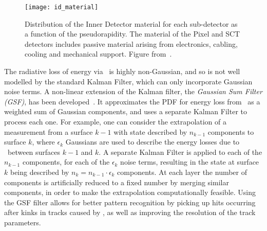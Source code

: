 \begin{figure}[h]
\centering
            \texttt{[image: id\_material]}
\caption{
Distribution of the Inner Detector material for each sub-detector as a
function of the pseudorapidity. The material of the Pixel and SCT detectors
includes passive material arising from electronics, cabling, cooling and
mechanical support. Figure from~\cite{ATLAS-CONF-2012-047}.}
\label{fig:id-material}
\end{figure}


The radiative loss of energy via \brem\ is highly non-Gaussian, and so is not
well modelled by the standard Kalman Filter, which can only incorporate Gaussian
noise terms. A non-linear extension of the
Kalman filter, the {\it Gaussian Sum Filter (GSF)}, has been
developed~\cite{Fruhwirth2003131,Atkinson:1448253}. It
approximates the PDF for energy loss from \brem\ as a weighted sum of Gaussian
components, and uses a separate Kalman Filter to process each one. For example,
one can consider the extrapolation of a measurement from a surface $k-1$ with state
described by $n_{k-1}$ components to surface $k$, where $\epsilon_{k}$ Gaussians
are used to describe the energy losses due to \brem\ between surfaces $k-1$ and
$k$. A separate Kalman Filter is applied to each of the $n_{k-1}$
components, for each of the $\epsilon_{k}$ noise terms, resulting in the state at
surface $k$ being described by $n_{k} = n_{k-1} \cdot \epsilon_{k}$ components.
At each layer the number of components is artificially reduced to a fixed number
by merging similar components,
in order to make the extrapolation computationally feasible.
Using the GSF filter allows for better pattern recognition by picking up hits
occurring after kinks in tracks caused by \brem, as well as improving the
resolution of the track parameters.


